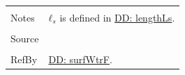 \documentclass[12pt]{article}
\begin{document}
\begin{minipage}{\textwidth}
\begin{tabular}{p{} p{}}
                                                  \\ \midrule \\
                                                  Notes & ${ℓ_{s}}$ is defined in \hyperref[DD:lengthLs]{DD: lengthLs}.
                                                          \\ \midrule \\
                                                          Source & \cite{fredlund1977}
                                                                   \\ \midrule \\
                                                                   RefBy & \hyperref[DD:surfWtrF]{DD: surfWtrF}.
\\ \bottomrule \end{tabular}
\end{minipage}
\par~
\end{document}
